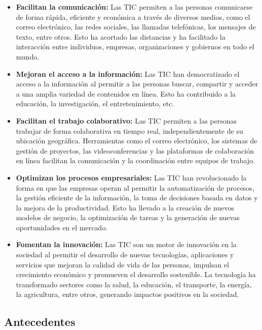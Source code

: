 \documentclass{article}
\begin{document}
    \begin{itemize}
      \item \textbf{Facilitan la comunicación:} Las TIC permiten a las personas comunicarse de forma rápida, eficiente y económica a través de diversos medios, como el correo electrónico, las redes sociales, las llamadas telefónicas, los mensajes de texto, entre otros. Esto ha acortado las distancias y ha facilitado la interacción entre individuos, empresas, organizaciones y gobiernos en todo el mundo.

      \item \textbf{Mejoran el acceso a la información:} Las TIC han democratizado el acceso a la información al permitir a las personas buscar, compartir y acceder a una amplia variedad de contenidos en línea. Esto ha contribuido a la educación, la investigación, el entretenimiento, etc.
      
      \item \textbf{Facilitan el trabajo colaborativo:} Las TIC permiten a las personas trabajar de forma colaborativa en tiempo real, independientemente de su ubicación geográfica. Herramientas como el correo electrónico, los sistemas de gestión de proyectos, las videoconferencias y las plataformas de colaboración en línea facilitan la comunicación y la coordinación entre equipos de trabajo.
      
      \item \textbf{Optimizan los procesos empresariales:} Las TIC han revolucionado la forma en que las empresas operan al permitir la automatización de procesos, la gestión eficiente de la información, la toma de decisiones basada en datos y la mejora de la productividad. Esto ha llevado a la creación de nuevos modelos de negocio, la optimización de tareas y la generación de nuevas oportunidades en el mercado.
      
      \item \textbf{Fomentan la innovación:} Las TIC son un motor de innovación en la sociedad al permitir el desarrollo de nuevas tecnologías, aplicaciones y servicios que mejoran la calidad de vida de las personas, impulsan el crecimiento económico y promueven el desarrollo sostenible. La tecnología ha transformado sectores como la salud, la educación, el transporte, la energía, la agricultura, entre otros, generando impactos positivos en la sociedad.
    \end{itemize}

\newpage 

\subsection{Antecedentes}
\end{document}
